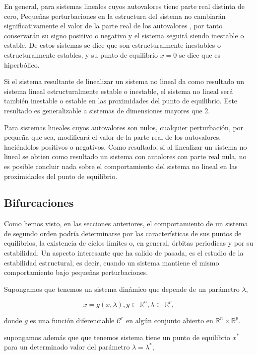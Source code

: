 En general, para sistemas lineales cuyos autovalores tiene parte real distinta de cero, Pequeñas perturbaciones en la estructura del sistema no cambiarán significativamente el valor de la parte real de los autovalores , por tanto conservarán su signo positivo o negativo y el sistema seguirá siendo inestable o estable. De estos sistemas se dice que son estructuralmente inestables o estructuralmente estables, y su punto de equilibrio $x=0$ se dice que es hiperbólico. 

Si el sistema resultante de linealizar un sistema no lineal da como resultado un sistema lineal estructuralmente estable o inestable, el sistema no lineal será también inestable o estable en las proximidades del punto de equilibrio. Este resultado es generalizable a sistemas de dimensiones mayores que 2.

Para  sistemas lineales cuyos autovalores son nulos, cualquier perturbación, por pequeña que sea, modificará el valor de la parte real de los autovalores, haciéndolos positivos o negativos. Como resultado, si al linealizar un sistema no lineal se obtien como resultado un sistema con autolores con parte real nula, no es posible concluir nada sobre el comportamiento del sistema no lineal en las proximidades del punto de equilibrio.

\subsection{Bifurcaciones}

Como hemos visto, en las secciones anteriores, el comportamiento de un sistema de segundo orden podría determinarse por las características de sus puntos de equilibrios, la existencia de ciclos límites o, en general, órbitas periodicas y por su estabilidad.
Un aspecto interesante que ha salido de pasada, es el estudio de la estabilidad estructural, es decir,  cuando un sistema mantiene el mismo comportamiento bajo pequeñas perturbaciones.

Supongamos que tenemos un sistema dinámico que depende de un parámetro $\lambda$,

\begin{equation}
\dot x = g(x,\lambda), y \in \ \mathbb{R}^n, \lambda \in \ \mathbb{R}^p,
\end{equation}

donde $g$ es una función diferenciable $\mathcal{C}^r$ en algún conjunto abierto en $ \mathbb{R}^n \times  \mathbb{R}^p$.

supongamos además que que tenemos sistema tiene un punto de equilibrio $x^*$ para un determinado valor del parámetro $\lambda = \lambda^*$,


